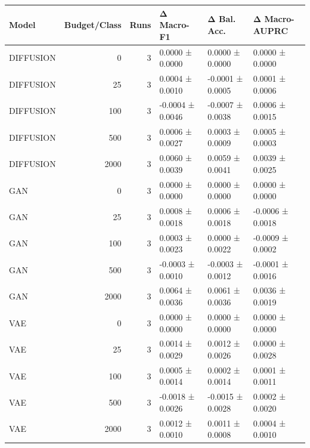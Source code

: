 \begin{tabular}{lrrlll}
\toprule
Model & Budget/Class & Runs & Δ Macro-F1 & Δ Bal. Acc. & Δ Macro-AUPRC \\
\midrule
DIFFUSION & 0 & 3 & 0.0000 ± 0.0000 & 0.0000 ± 0.0000 & 0.0000 ± 0.0000 \\
DIFFUSION & 25 & 3 & 0.0004 ± 0.0010 & -0.0001 ± 0.0005 & 0.0001 ± 0.0006 \\
DIFFUSION & 100 & 3 & -0.0004 ± 0.0046 & -0.0007 ± 0.0038 & 0.0006 ± 0.0015 \\
DIFFUSION & 500 & 3 & 0.0006 ± 0.0027 & 0.0003 ± 0.0009 & 0.0005 ± 0.0003 \\
DIFFUSION & 2000 & 3 & 0.0060 ± 0.0039 & 0.0059 ± 0.0041 & 0.0039 ± 0.0025 \\
GAN & 0 & 3 & 0.0000 ± 0.0000 & 0.0000 ± 0.0000 & 0.0000 ± 0.0000 \\
GAN & 25 & 3 & 0.0008 ± 0.0018 & 0.0006 ± 0.0018 & -0.0006 ± 0.0018 \\
GAN & 100 & 3 & 0.0003 ± 0.0023 & 0.0000 ± 0.0022 & -0.0009 ± 0.0002 \\
GAN & 500 & 3 & -0.0003 ± 0.0010 & -0.0003 ± 0.0012 & -0.0001 ± 0.0016 \\
GAN & 2000 & 3 & 0.0064 ± 0.0036 & 0.0061 ± 0.0036 & 0.0036 ± 0.0019 \\
VAE & 0 & 3 & 0.0000 ± 0.0000 & 0.0000 ± 0.0000 & 0.0000 ± 0.0000 \\
VAE & 25 & 3 & 0.0014 ± 0.0029 & 0.0012 ± 0.0026 & 0.0000 ± 0.0028 \\
VAE & 100 & 3 & 0.0005 ± 0.0014 & 0.0002 ± 0.0014 & 0.0001 ± 0.0011 \\
VAE & 500 & 3 & -0.0018 ± 0.0026 & -0.0015 ± 0.0028 & 0.0002 ± 0.0020 \\
VAE & 2000 & 3 & 0.0012 ± 0.0010 & 0.0011 ± 0.0008 & 0.0004 ± 0.0010 \\
\bottomrule
\end{tabular}
